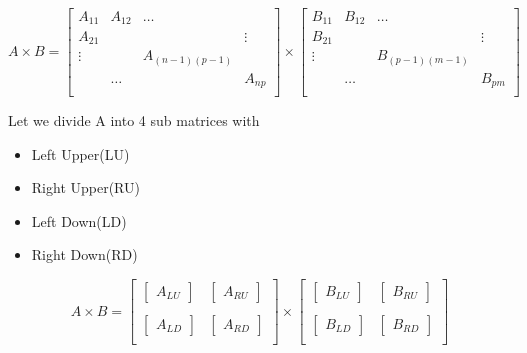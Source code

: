 \documentclass[a4paper,11pt]{article}
\numberwithin{equation}{section}
\begin{document}
\begin{itemize}
        \begin{center}
            \[ A \times B =
            \begin{bmatrix}
                A_{11} &A_{12} & \dots & \\
                A_{21}&  & &\vdots \\
                \vdots  & & A_{(n-1)(p-1)}& \\
                & \dots & & A_{np}\\
            \end{bmatrix} \times
            \begin{bmatrix}
                B_{11} &B_{12} & \dots & \\
                B_{21}&  & &\vdots \\
                \vdots  & & B_{(p-1)(m-1)}& \\
                & \dots & & B_{pm}\\
            \end{bmatrix}
            \]
        \end{center}
    Let we divide A into 4 sub matrices with
    \begin{itemize}
        \item Left Upper(LU)
        \item Right Upper(RU)
        \item Left Down(LD)
        \item Right Down(RD)
    \end{itemize}
        \begin{center}
            \[ A \times B =
            \begin{bmatrix}
                \begin{bmatrix} A_{LU} \end{bmatrix}&\begin{bmatrix}A_{RU} \end{bmatrix} \\
                \\
                \begin{bmatrix}A_{LD} \end{bmatrix}&\begin{bmatrix}A_{RD} \end{bmatrix} \\
            \end{bmatrix} \times
            \begin{bmatrix}
                \begin{bmatrix} B_{LU} \end{bmatrix}&\begin{bmatrix}B_{RU} \end{bmatrix} \\
                \\
                \begin{bmatrix}B_{LD} \end{bmatrix}&\begin{bmatrix}B_{RD} \end{bmatrix} \\
            \end{bmatrix}
            \]
        \end{center}


\end{itemize}
\end{document}
